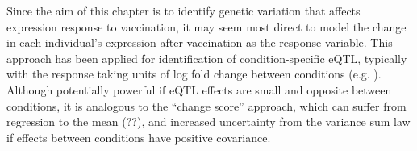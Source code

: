 Since the aim of this chapter is to identify genetic variation that affects expression response to vaccination, it may seem most direct to model the change in each individual's expression after vaccination as the response variable.
This approach has been applied for identification of condition-specific \gls{eQTL}, typically with the response taking units of log fold change between conditions (e.g. \autocite{maranville2011InteractionsGlucocorticoidTreatment,ackermann2013ImpactNaturalGenetic,shpak2014EQTLAnalysisHuman}).
Although potentially powerful if \gls{eQTL} effects are small and opposite between conditions\autocite{ackermann2013ImpactNaturalGenetic}, 
it is analogous to the \enquote{change score} approach, which can suffer from regression to the mean (??), and increased uncertainty from the variance sum law if effects between conditions have positive covariance\autocite{allison1990ChangeScoresDependent,clifton2019CorrelationBaselineScore}.
%

%
%
%
%
%
%

